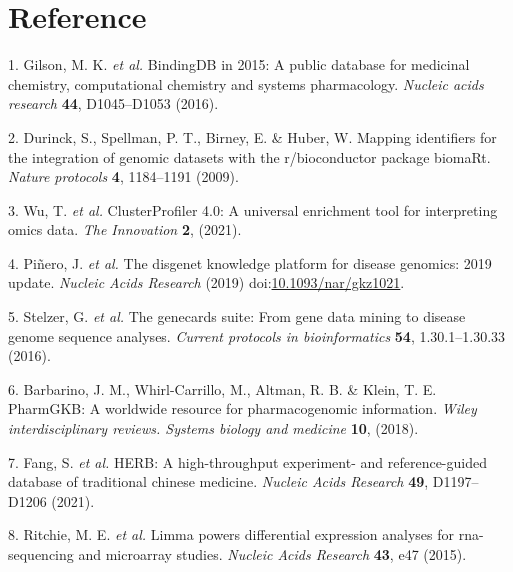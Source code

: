 \documentclass[
]{article}
\newenvironment{cslreferences}%
  {}%
  {\par}
\begin{document}
\hypertarget{bibliography}{%
\section*{Reference}\label{bibliography}}

\hypertarget{refs}{}
\begin{cslreferences}
\leavevmode\hypertarget{ref-BindingdbIn20Gilson2016}{}%
1. Gilson, M. K. \emph{et al.} BindingDB in 2015: A public database for medicinal chemistry, computational chemistry and systems pharmacology. \emph{Nucleic acids research} \textbf{44}, D1045--D1053 (2016).

\leavevmode\hypertarget{ref-MappingIdentifDurinc2009}{}%
2. Durinck, S., Spellman, P. T., Birney, E. \& Huber, W. Mapping identifiers for the integration of genomic datasets with the r/bioconductor package biomaRt. \emph{Nature protocols} \textbf{4}, 1184--1191 (2009).

\leavevmode\hypertarget{ref-ClusterprofilerWuTi2021}{}%
3. Wu, T. \emph{et al.} ClusterProfiler 4.0: A universal enrichment tool for interpreting omics data. \emph{The Innovation} \textbf{2}, (2021).

\leavevmode\hypertarget{ref-TheDisgenetKnPinero2019}{}%
4. Piñero, J. \emph{et al.} The disgenet knowledge platform for disease genomics: 2019 update. \emph{Nucleic Acids Research} (2019) doi:\href{https://doi.org/10.1093/nar/gkz1021}{10.1093/nar/gkz1021}.

\leavevmode\hypertarget{ref-TheGenecardsSStelze2016}{}%
5. Stelzer, G. \emph{et al.} The genecards suite: From gene data mining to disease genome sequence analyses. \emph{Current protocols in bioinformatics} \textbf{54}, 1.30.1--1.30.33 (2016).

\leavevmode\hypertarget{ref-PharmgkbAWorBarbar2018}{}%
6. Barbarino, J. M., Whirl-Carrillo, M., Altman, R. B. \& Klein, T. E. PharmGKB: A worldwide resource for pharmacogenomic information. \emph{Wiley interdisciplinary reviews. Systems biology and medicine} \textbf{10}, (2018).

\leavevmode\hypertarget{ref-HerbAHighThFang2021}{}%
7. Fang, S. \emph{et al.} HERB: A high-throughput experiment- and reference-guided database of traditional chinese medicine. \emph{Nucleic Acids Research} \textbf{49}, D1197--D1206 (2021).

\leavevmode\hypertarget{ref-LimmaPowersDiRitchi2015}{}%
8. Ritchie, M. E. \emph{et al.} Limma powers differential expression analyses for rna-sequencing and microarray studies. \emph{Nucleic Acids Research} \textbf{43}, e47 (2015).


\end{cslreferences}
\end{document}
